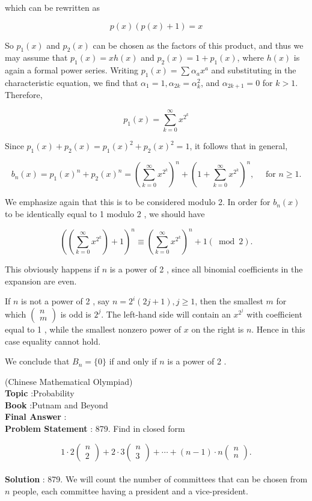 \documentclass[10pt]{article}
\begin{document}
which can be rewritten as

$$
p(x)(p(x)+1)=x
$$

So $p_{1}(x)$ and $p_{2}(x)$ can be chosen as the factors of this product, and thus we may assume that $p_{1}(x)=x h(x)$ and $p_{2}(x)=1+p_{1}(x)$, where $h(x)$ is again a formal power series. Writing $p_{1}(x)=\sum \alpha_{a} x^{a}$ and substituting in the characteristic equation, we find that $\alpha_{1}=1, \alpha_{2 k}=\alpha_{k}^{2}$, and $\alpha_{2 k+1}=0$ for $k>1$. Therefore,

$$
p_{1}(x)=\sum_{k=0}^{\infty} x^{2^{k}}
$$

Since $p_{1}(x)+p_{2}(x)=p_{1}(x)^{2}+p_{2}(x)^{2}=1$, it follows that in general,

$$
b_{n}(x)=p_{1}(x)^{n}+p_{2}(x)^{n}=\left(\sum_{k=0}^{\infty} x^{2^{k}}\right)^{n}+\left(1+\sum_{k=0}^{\infty} x^{2^{k}}\right)^{n}, \quad \text { for } n \geq 1 .
$$

We emphasize again that this is to be considered modulo 2. In order for $b_{n}(x)$ to be identically equal to 1 modulo 2 , we should have

$$
\left(\left(\sum_{k=0}^{\infty} x^{2^{k}}\right)+1\right)^{n} \equiv\left(\sum_{k=0}^{\infty} x^{2^{k}}\right)^{n}+1(\bmod 2) .
$$

This obviously happens if $n$ is a power of 2 , since all binomial coefficients in the expansion are even.

If $n$ is not a power of 2 , say $n=2^{i}(2 j+1), j \geq 1$, then the smallest $m$ for which $\left(\begin{array}{l}n \\ m\end{array}\right)$ is odd is $2^{j}$. The left-hand side will contain an $x^{2^{j}}$ with coefficient equal to 1 , while the smallest nonzero power of $x$ on the right is $n$. Hence in this case equality cannot hold.

We conclude that $B_{n}=\{0\}$ if and only if $n$ is a power of 2 .

(Chinese Mathematical Olympiad)
\\
\textbf{Topic} :Probability\\
\textbf{Book} :Putnam and Beyond\\
\textbf{Final Answer} :\\


\textbf{Problem Statement} :
879. Find in closed form

$$
1 \cdot 2\left(\begin{array}{l}
n \\
2
\end{array}\right)+2 \cdot 3\left(\begin{array}{l}
n \\
3
\end{array}\right)+\cdots+(n-1) \cdot n\left(\begin{array}{l}
n \\
n
\end{array}\right) .
$$
\\
\textbf{Solution} :
879. We will count the number of committees that can be chosen from $n$ people, each committee having a president and a vice-president.
\end{document}
